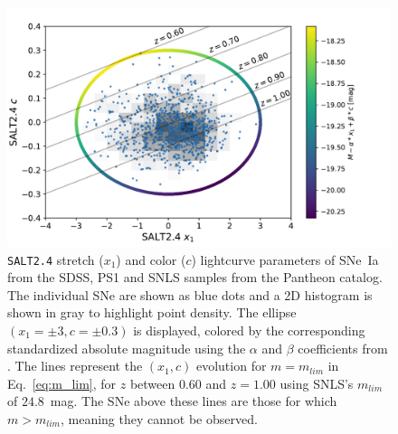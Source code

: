 \documentclass[]{aa} %
\newcommand{\nn}[1]{{\textcolor[rgb]{1, 0.27, 0}{#1}}}
\begin{document}
\begin{figure}
    \centering
    \includegraphics[width=0.95\linewidth]{Article_figures/zmax_maglim_snls.pdf}
    \caption{\textsc{\texttt{SALT2.4}} stretch ($x_1$) and color ($c$) lightcurve parameters
        of SNe~Ia from the SDSS, PS1 and SNLS samples from the Pantheon catalog.
        The individual SNe are shown as blue dots and a 2D histogram is
        shown in gray to highlight point density. The ellipse
        $(x_1=\pm3, c=\pm0.3)$ is displayed, colored by the
        corresponding standardized absolute magnitude using the $\alpha$ and
        $\beta$ coefficients from \cite{scolnic2018a}. \nn{The lines represent
        the $(x_1, c)$ evolution for $m = m_{lim}$ in Eq.~\ref{eq:m_lim},
    for $z$ between $0.60$ and $z=1.00$ using SNLS's $m_{lim}$ of $24.8$~mag. The SNe
    above these lines are those for which $m > m_{lim}$, meaning they cannot be
    observed.}}
    \label{fig:maglim}
\end{figure}
\end{document}

